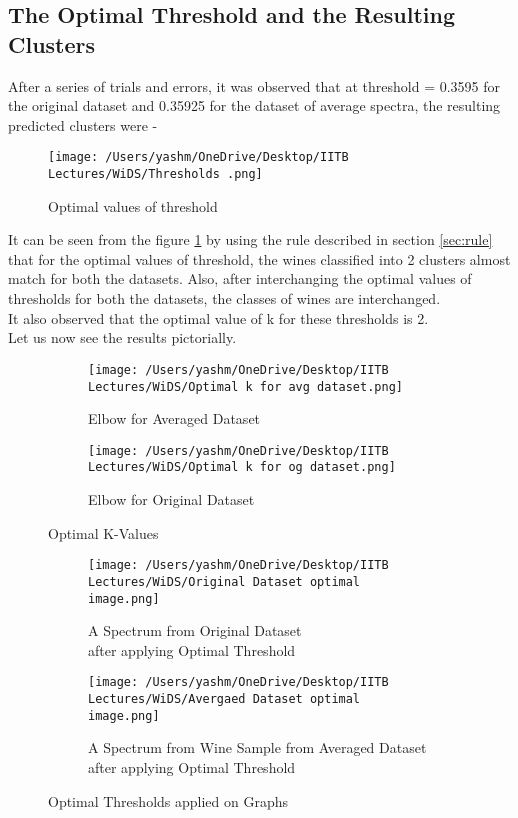 \documentclass{article}
\begin{document}
\subsection{The Optimal Threshold and the Resulting Clusters}
After a series of trials and errors, it was observed that at threshold = 0.3595 for the original dataset and 0.35925 for the dataset of average spectra, the resulting predicted clusters were - \\
\begin{figure}[H]
	\centering
	\texttt{[image: /Users/yashm/OneDrive/Desktop/IITB Lectures/WiDS/Thresholds .png]}
	\caption[Optional Caption]{Optimal values of threshold}
	\label{fig:fig6}
\end{figure}
It can be seen from the figure \ref{fig:fig6} by using the rule described in section \ref{sec:rule} that for the optimal values of threshold, the wines classified into 2 clusters almost match for both the datasets. Also, after interchanging the optimal values of thresholds for both the datasets, the classes of wines are interchanged.\\
\newline
It also observed that the optimal value of k for these thresholds is 2.\\  
\newline
Let us now see the results pictorially.\\
\begin{figure}[H]
\centering
\begin{subfigure}{0.5\textwidth}
\centering
\texttt{[image: /Users/yashm/OneDrive/Desktop/IITB Lectures/WiDS/Optimal k for avg dataset.png]}
\caption[Optional Caption]{Elbow for Averaged Dataset}
\end{subfigure}%
\begin{subfigure}{0.5\textwidth}
\centering
\texttt{[image: /Users/yashm/OneDrive/Desktop/IITB Lectures/WiDS/Optimal k for og dataset.png]}
\caption[Optional Caption]{Elbow for Original Dataset}
\end{subfigure}
\caption[Optional Caption]{Optimal K-Values}
\end{figure}


\begin{figure}[H]
\centering
\begin{subfigure}{0.5\textwidth}
\centering
\texttt{[image: /Users/yashm/OneDrive/Desktop/IITB Lectures/WiDS/Original Dataset optimal image.png]}
\caption[Optional Caption]{A Spectrum from Original Dataset \\after applying Optimal Threshold}
\end{subfigure}%
\begin{subfigure}{0.5\textwidth}
\centering
\texttt{[image: /Users/yashm/OneDrive/Desktop/IITB Lectures/WiDS/Avergaed Dataset optimal image.png]}
\caption[Optional Caption]{A Spectrum from Wine Sample from Averaged Dataset \\after applying Optimal Threshold}
\end{subfigure}
\caption[Optional Caption]{Optimal Thresholds applied on Graphs}
\end{figure}
\end{document}
